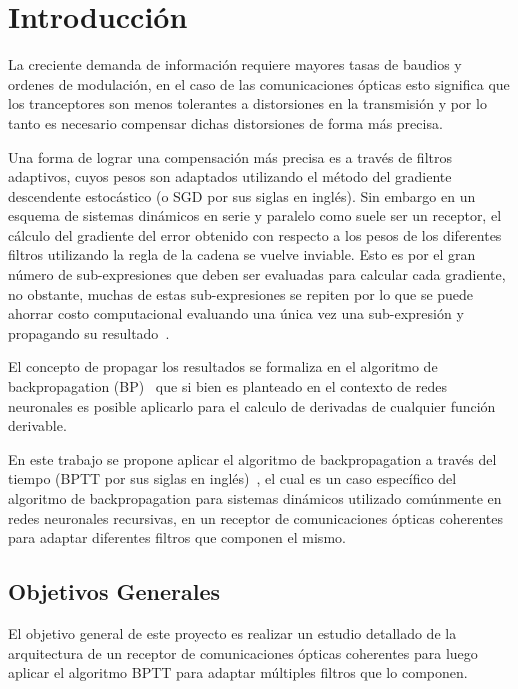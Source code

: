 \documentclass[12pt, twoside]{unc_so2_template}
\begin{document}

\tableofcontents
\listoffigures
\listoftables
\printnomenclature

\mainmatter

\chapter{Introducción}
La creciente demanda de información requiere mayores tasas de baudios y ordenes
de modulación, en el caso de las comunicaciones ópticas esto significa que los
tranceptores son menos tolerantes a distorsiones en la transmisión y por lo
tanto es necesario compensar dichas distorsiones de forma más precisa.

Una forma de lograr una compensación más precisa es a través de filtros
adaptivos, cuyos pesos son adaptados utilizando el método del gradiente
descendente estocástico (o SGD por sus siglas en inglés). Sin embargo en un
esquema de sistemas dinámicos en serie y paralelo como suele ser un receptor, el
cálculo del gradiente del error obtenido con respecto a los pesos de los
diferentes filtros utilizando la regla de la cadena se vuelve inviable. Esto es
por el gran número de sub-expresiones que deben ser evaluadas para calcular cada
gradiente, no obstante, muchas de estas sub-expresiones se repiten por lo que se
puede ahorrar costo computacional evaluando una única vez una sub-expresión y
propagando su resultado~\citep{Goodfellow-et-al-2016}.

El concepto de propagar los resultados se formaliza en el algoritmo de
backpropagation (BP)~\citep{Rumelhart1986} que si bien es planteado en el contexto de
redes neuronales es posible aplicarlo para el calculo de derivadas de cualquier
función derivable.

En este trabajo se propone aplicar el algoritmo de backpropagation a través del
tiempo (BPTT por sus siglas en inglés)~\cite{werbos1990}, el cual es un caso
específico del algoritmo de backpropagation para sistemas dinámicos utilizado
comúnmente en redes neuronales recursivas, en un receptor de comunicaciones
ópticas coherentes para adaptar diferentes filtros que componen el mismo.

\section{Objetivos Generales}
El objetivo general de este proyecto es realizar un estudio detallado de la
arquitectura de un receptor de comunicaciones ópticas coherentes para luego
aplicar el algoritmo BPTT para adaptar múltiples filtros que lo componen.
\end{document}

